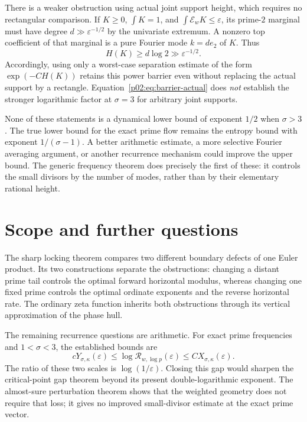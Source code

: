 \documentclass[11pt,letterpaper]{article}
\theoremstyle{definition}
\theoremstyle{remark}
\newcommand{\eps}{\varepsilon}
\newcommand{\1}{\mathbf 1}
\begin{document}
There is a weaker obstruction using actual joint support height, which
requires no rectangular comparison. If $K\ge0$, $\int K=1$, and
$\int \mathcal E_wK\le\varepsilon$, its prime-$2$ marginal must have degree
$d\gg\varepsilon^{-1/2}$ by the univariate extremum. A nonzero top
coefficient of that marginal is a pure Fourier mode $k=d e_2$ of $K$.
Thus
\begin{equation}\label{p02:eq:barrier-actual}
 H(K)\ge d\log2\gg\varepsilon^{-1/2}.
\end{equation}
Accordingly, using only a worst-case separation estimate of the form
$\exp(-C H(K))$ retains this power barrier even without replacing the
actual support by a rectangle. Equation~\eqref{p02:eq:barrier-actual} does
\emph{not} establish the stronger logarithmic factor at $\sigma=3$
for arbitrary joint supports.

None of these statements is a dynamical lower bound of exponent $1/2$
when $\sigma>3$. The true lower bound for the exact prime flow remains
the entropy bound with exponent $1/(\sigma-1)$. A better arithmetic
estimate, a more selective Fourier averaging argument, or another
recurrence mechanism could improve the upper bound. The generic
frequency theorem does precisely the first of these: it controls the
small divisors by the number of modes, rather than by their elementary
rational height.


\section{Scope and further questions}

The sharp locking theorem compares two different boundary defects of
one Euler product. Its two constructions separate the obstructions:
changing a distant prime tail controls the optimal forward horizontal
modulus, whereas changing one fixed prime controls the optimal
ordinate exponents and the reverse horizontal rate. The ordinary
zeta function inherits both obstructions through its vertical
approximation of the phase hull.

The remaining recurrence questions are arithmetic. For exact prime
frequencies and $1<\sigma<3$, the established bounds are
\[
 cY_{\sigma,\kappa}(\eps)
 \le\log\mathcal R_{w,\log p}(\eps)
 \le CX_{\sigma,\kappa}(\eps).
\]
The ratio of these two scales is $\log(1/\eps)$. Closing this gap
would sharpen the critical-point gap theorem beyond its present
double-logarithmic exponent. The almost-sure perturbation theorem
shows that the weighted geometry does not require that loss; it gives
no improved small-divisor estimate at the exact prime vector.
\end{document}
